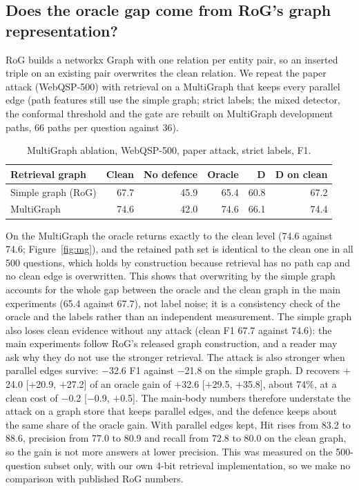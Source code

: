 \documentclass[preprint,12pt]{elsarticle}
\begin{document}
\subsection{Does the oracle gap come from RoG's graph representation?}\label{sec:multigraph}
RoG builds a networkx Graph with one relation per entity pair, so an inserted triple on an existing pair overwrites the clean relation. We repeat the paper attack (WebQSP-500) with retrieval on a MultiGraph that keeps every parallel edge (path features still use the simple graph; strict labels; the mixed detector, the conformal threshold and the gate are rebuilt on MultiGraph development paths, 66 paths per question against 36).
\begin{table}[tbp]
\centering\small
\begin{tabular}{@{}lrrrrr@{}}
\toprule
Retrieval graph & Clean & No defence & Oracle & D & D on clean \\
\midrule
Simple graph (RoG) & 67.7 & 45.9 & 65.4 & 60.8 & 67.2 \\
MultiGraph & 74.6 & 42.0 & 74.6 & 66.1 & 74.4 \\
\bottomrule
\end{tabular}
\caption{MultiGraph ablation, WebQSP-500, paper attack, strict labels, F1.}
\end{table}
On the MultiGraph the oracle returns exactly to the clean level (74.6 against 74.6; Figure~\ref{fig:mg}), and the retained path set is identical to the clean one in all 500 questions, which holds by construction because retrieval has no path cap and no clean edge is overwritten. This shows that overwriting by the simple graph accounts for the whole gap between the oracle and the clean graph in the main experiments (65.4 against 67.7), not label noise; it is a consistency check of the oracle and the labels rather than an independent measurement. The simple graph also loses clean evidence without any attack (clean F1 67.7 against 74.6): the main experiments follow RoG's released graph construction, and a reader may ask why they do not use the stronger retrieval. The attack is also stronger when parallel edges survive: $-$32.6 F1 against $-$21.8 on the simple graph. D recovers $+$24.0 [$+$20.9, $+$27.2] of an oracle gain of $+$32.6 [$+$29.5, $+$35.8], about 74\%, at a clean cost of $-$0.2 [$-$0.9, $+$0.5]. The main-body numbers therefore understate the attack on a graph store that keeps parallel edges, and the defence keeps about the same share of the oracle gain. With parallel edges kept, Hit rises from 83.2 to 88.6, precision from 77.0 to 80.9 and recall from 72.8 to 80.0 on the clean graph, so the gain is not more answers at lower precision. This was measured on the 500-question subset only, with our own 4-bit retrieval implementation, so we make no comparison with published RoG numbers.
\end{document}
